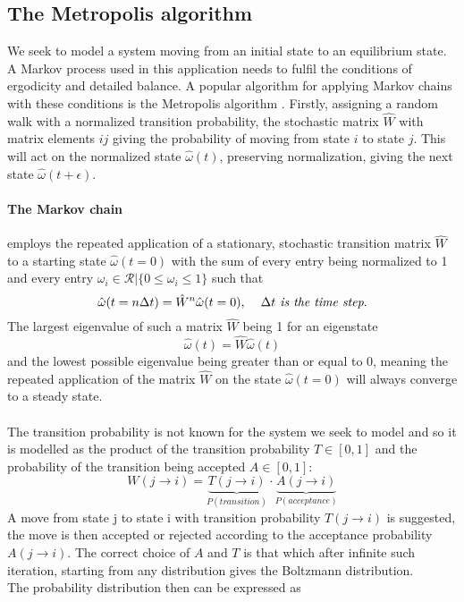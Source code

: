 \documentclass[10pt,a4paper]{article}
\begin{document}
\subsection{The Metropolis algorithm}
We seek to model a system moving from an initial state to an equilibrium state. A Markov process used in this application needs to fulfil the conditions of ergodicity and detailed balance. A popular algorithm for applying Markov chains with these conditions is the Metropolis algorithm \cite{Lecture_Notes_Fall_2015}. Firstly, assigning a random walk with a normalized transition probability, the stochastic matrix $\hat{W}$ with matrix elements $ij$ giving the probability of moving from state $i$ to state $j$. This will act on the normalized state $\hat{\omega}(t)$, preserving normalization, giving the next state $\hat{\omega}(t+\epsilon)$.
\paragraph{The Markov chain}employs the repeated application of a stationary, stochastic transition matrix $\hat{W}$ to a starting state $\hat{\omega}(t=0)$ with the sum of every entry being normalized to 1 and every entry $\omega_i \in \mathcal{R} | \{0\leq \omega_i \leq 1\}$ such that
\begin{equation}
\hat{\omega}(t= n\Delta t) = \hat{W}^n\hat{\omega}(t=0),\hspace{4mm} \Delta t \textit{ is the time step}.
\end{equation}
The largest eigenvalue of such a matrix $\hat{W}$ being 1 \cite{Lecture_Notes_Fall_2015} for an eigenstate
\begin{equation}
\hat{\omega}(t) = \hat{W}\hat{\omega}(t)
\end{equation}
and the lowest possible eigenvalue being greater than or equal to 0, meaning the repeated application of the  matrix $\hat{W}$ on the state $\hat{\omega}(t=0)$ will always converge to a steady state.\\\\The transition probability is not known for the system we seek to model and so it is modelled as the product of the transition probability $T \in[0,1]$ and the probability of the transition being accepted $A\in[0,1]$:
\begin{equation}
W(j\rightarrow i) = \underbrace{T(j\rightarrow i)}_{P(transition)}\cdot\underbrace{A(j\rightarrow i)}_{P(acceptance)}
\end{equation}
A move from state j to state i with transition probability $T(j\rightarrow i)$ is suggested, the move is then accepted or rejected according to the acceptance probability $A(j\rightarrow i)$. The correct choice of $A$ and $T$ is that which after infinite such iteration, starting from any distribution gives the Boltzmann distribution.\\The probability distribution then can be expressed as 
\end{document}
